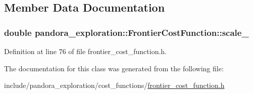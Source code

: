 \subsection{\-Member \-Data \-Documentation}
\hypertarget{classpandora__exploration_1_1_frontier_cost_function_a6e2e9cdea6214251fafe6042425f4e32}{
\subsubsection[{scale\-\_\-}]{\setlength{\rightskip}{0pt plus 5cm}double {\bf pandora\-\_\-exploration\-::\-Frontier\-Cost\-Function\-::scale\-\_\-}}}\label{classpandora__exploration_1_1_frontier_cost_function_a6e2e9cdea6214251fafe6042425f4e32}


\-Definition at line 76 of file frontier\-\_\-cost\-\_\-function.\-h.



\-The documentation for this class was generated from the following file\-:\begin{DoxyCompactItemize}
\item 
include/pandora\-\_\-exploration/cost\-\_\-functions/\hyperlink{frontier__cost__function_8h}{frontier\-\_\-cost\-\_\-function.\-h}\end{DoxyCompactItemize}
